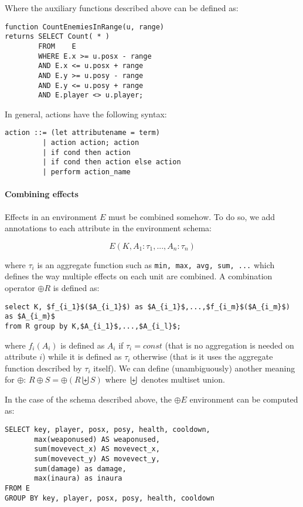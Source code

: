 Where the auxiliary functions described above can be defined as:

\begin{lstlisting}
function CountEnemiesInRange(u, range) 
returns SELECT Count( * ) 
        FROM	E
        WHERE E.x >= u.posx - range
        AND	E.x <= u.posx + range
        AND	E.y >= u.posy - range
        AND	E.y <= u.posy + range
        AND	E.player <> u.player;
\end{lstlisting}

In general, actions have the following syntax:

\begin{lstlisting}
action ::= (let attributename = term) 
         | action action; action 
         | if cond then action 
         | if cond then action else action 
         | perform action_name
\end{lstlisting}


\paragraph{Combining effects}
Effects in an environment $E$ must be combined somehow. To do so, we add annotations to each attribute in the environment schema:

$$E(K,A_1:\tau_1,...,A_n:\tau_n)$$

where $\tau_i$ is an aggregate function such as \texttt{min, max, avg, sum, ...} which defines the way multiple effects on each unit are combined. A combination operator $\oplus R$ is defined as:

\begin{lstlisting}
select K, $f_{i_1}$($A_{i_1}$) as $A_{i_1}$,...,$f_{i_m}$($A_{i_m}$) as $A_{i_m}$
from R group by K,$A_{i_1}$,...,$A_{i_l}$;
\end{lstlisting}

where $f_i(A_i)$ is defined as $A_i$ if $\tau_i = const$ (that is no aggregation is needed on attribute $i$) while it is defined as $\tau_i$ otherwise (that is it uses the aggregate function described by $\tau_i$ itself). We can define (unambiguously) another meaning for $\oplus$: $R \oplus S = \oplus(R \biguplus S)$ where $\biguplus$ denotes multiset union.

In the case of the schema described above, the $\oplus E$ environment can be computed as:

\begin{lstlisting}
SELECT key, player, posx, posy, health, cooldown, 
       max(weaponused) AS weaponused, 
       sum(movevect_x) AS movevect_x, 
       sum(movevect_y) AS movevect_y, 
       sum(damage) as damage,
       max(inaura) as inaura
FROM E
GROUP BY key, player, posx, posy, health, cooldown
\end{lstlisting}

